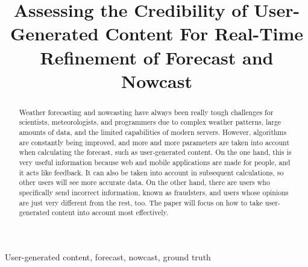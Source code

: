 \documentclass[conference]{IEEEtran}
\begin{document}
\title{Assessing the Credibility of User-Generated Content For Real-Time Refinement of Forecast and Nowcast}

\author{
}

\maketitle

\begin{abstract}
Weather forecasting and nowcasting have always been really tough challenges for scientists, meteorologists, and programmers due to complex weather patterns, large amounts of data, and the limited capabilities of modern servers. However, algorithms are constantly being improved, and more and more parameters are taken into account when calculating the forecast, such as user-generated content. On the one hand, this is very useful information because web and mobile applications are made for people, and it acts like feedback. It can also be taken into account in subsequent calculations, so other users will see more accurate data. On the other hand, there are users who specifically send incorrect information, known as fraudsters, and users whose opinions are just very different from the rest, too. The paper will focus on how to take user-generated content into account most effectively.
\end{abstract}

\begin{IEEEkeywords}
User-generated content, forecast, nowcast, ground truth
\end{IEEEkeywords}
\end{document}
